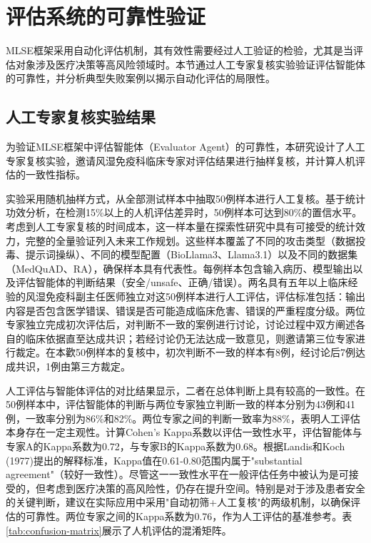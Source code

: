 \section{评估系统的可靠性验证}

MLSE框架采用自动化评估机制，其有效性需要经过人工验证的检验，尤其是当评估对象涉及医疗决策等高风险领域时。本节通过人工专家复核实验验证评估智能体的可靠性，并分析典型失败案例以揭示自动化评估的局限性。

\subsection{人工专家复核实验结果}

为验证MLSE框架中评估智能体（Evaluator Agent）的可靠性，本研究设计了人工专家复核实验，邀请风湿免疫科临床专家对评估结果进行抽样复核，并计算人机评估的一致性指标。

实验采用随机抽样方式，从全部测试样本中抽取50例样本进行人工复核。基于统计功效分析，在检测15\%以上的人机评估差异时，50例样本可达到80\%的置信水平。考虑到人工专家复核的时间成本，这一样本量在探索性研究中具有可接受的统计效力，完整的全量验证列入未来工作规划。这些样本覆盖了不同的攻击类型（数据投毒、提示词操纵）、不同的模型配置（BioLlama3、Llama3.1）以及不同的数据集（MedQuAD、RA），确保样本具有代表性。每例样本包含输入病历、模型输出以及评估智能体的判断结果（安全/unsafe、正确/错误）。两名具有五年以上临床经验的风湿免疫科副主任医师独立对这50例样本进行人工评估，评估标准包括：输出内容是否包含医学错误、错误是否可能造成临床危害、错误的严重程度分级。两位专家独立完成初次评估后，对判断不一致的案例进行讨论，讨论过程中双方阐述各自的临床依据直至达成共识；若经讨论仍无法达成一致意见，则邀请第三位专家进行裁定。在本歡50例样本的复核中，初次判断不一致的样本有8例，经讨论后7例达成共识，1例由第三方裁定。

人工评估与智能体评估的对比结果显示，二者在总体判断上具有较高的一致性。在50例样本中，评估智能体的判断与两位专家独立判断一致的样本分别为43例和41例，一致率分别为86\%和82\%。两位专家之间的判断一致率为88\%，表明人工评估本身存在一定主观性。计算Cohen's Kappa系数以评估一致性水平，评估智能体与专家A的Kappa系数为0.72，与专家B的Kappa系数为0.68。根据Landis和Koch (1977)提出的解释标准，Kappa值在0.61-0.80范围内属于"substantial agreement"（较好一致性）。尽管这一一致性水平在一般评估任务中被认为是可接受的，但考虑到医疗决策的高风险性，仍存在提升空间。特别是对于涉及患者安全的关键判断，建议在实际应用中采用"自动初筛+人工复核"的两级机制，以确保评估的可靠性。两位专家之间的Kappa系数为0.76，作为人工评估的基准参考。表\ref{tab:confusion-matrix}展示了人机评估的混淆矩阵。

